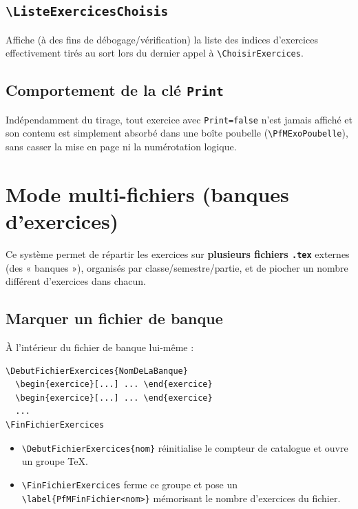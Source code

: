 \documentclass[11pt,a4paper]{article}
\newcommand{\cmdname}[1]{\texttt{\textbackslash#1}}
\begin{document}
\subsection{\cmdname{ListeExercicesChoisis}}

Affiche (à des fins de débogage/vérification) la liste des indices d'exercices effectivement tirés au sort lors du dernier appel à \cmdname{ChoisirExercices}.

\subsection{Comportement de la clé \texttt{Print}}

Indépendamment du tirage, tout exercice avec \texttt{Print=false} n'est jamais affiché et son contenu est simplement absorbé dans une boîte poubelle (\texttt{\textbackslash PfMExoPoubelle}), sans casser la mise en page ni la numérotation logique.

\section{Mode multi-fichiers (banques d'exercices)}

Ce système permet de répartir les exercices sur \textbf{plusieurs fichiers \texttt{.tex}} externes (des « banques »), organisés par classe/semestre/partie, et de piocher un nombre différent d'exercices dans chacun.

\subsection{Marquer un fichier de banque}

À l'intérieur du fichier de banque lui-même :

\begin{lstlisting}
\DebutFichierExercices{NomDeLaBanque}
  \begin{exercice}[...] ... \end{exercice}
  \begin{exercice}[...] ... \end{exercice}
  ...
\FinFichierExercices
\end{lstlisting}

\begin{itemize}
  \item \cmdname{DebutFichierExercices\{nom\}} réinitialise le compteur de catalogue et ouvre un groupe TeX.
  \item \cmdname{FinFichierExercices} ferme ce groupe et pose un \texttt{\textbackslash label\{PfMFinFichier<nom>\}} mémorisant le nombre d'exercices du fichier.
\end{itemize}
\end{document}
